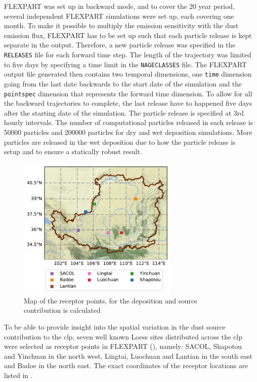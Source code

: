 FLEXPART was set up in backward mode, and to cover the 20 year period, several independent FLEXPART simulations were set up, each covering one month.   
To make it possible to multiply the emission sensitivity with the dust emission flux, FLEXPART has to be set up such that each particle release is kept separate in the output. 
Therefore, a new particle release was specified in the \verb|RELEASES| file for each forward time step. The length of the trajectory was limited to five days by specifying a time limit in the \verb|NAGECLASSES| file.
The FLEXPART output file generated then contains two temporal dimensions, one \verb|time| dimension going from the last date backwards to the start date of the simulation and the \verb|pointspec| dimension that represents the forward time dimension. 
To allow for all the backward trajectories to complete, the last release have to happened five days after the starting date of the simulation.   
The particle release is specified at 3rd hourly intervals. The number of computational particles released in each release is 50000 particles and 200000 particles for dry and wet deposition simulations. 
More particles are released in the wet deposition due to how the particle release is setup and to ensure a
statically robust result.

\begin{figure}[htpb]
    \centering
    \includegraphics[width=0.7\textwidth]{texfiles/figs/map_loess.pdf}
    \caption{Map of the receptor points, for the deposition and source contribution is calculated}
    \label{fig:maps_clp_location}
\end{figure}

To be able to provide insight into the spatial variation in the dust source contribution to the \acrshort{clp}, seven well known Loess sites distributed across the \acrshort{clp} were selected as receptor points in FLEXPART  (), namely: SACOL, Shapotou and Yinchuan in the north west, Lingtai, Luochuan and Lantian in the south east and Badoe in the north east. 
The exact coordinates of the receptor locations are listed in . 

